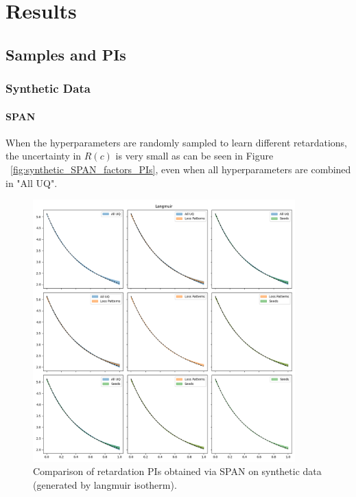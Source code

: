 \section{Results}
\subsection{Samples and PIs}
\subsubsection{Synthetic Data}

\paragraph{SPAN}
When the hyperparameters are randomly sampled to learn different retardations, the uncertainty in $R(c)$ is very small as can be seen in Figure ~\vref{fig:synthetic_SPAN_factors_PIs}, even when all hyperparameters are combined in "All UQ".

\begin{figure}
    \centering
    \includegraphics[width=0.9\textwidth]{figs/finn_synthetic_SPAN_factors_PIs.png}
    \caption{Comparison of retardation PIs obtained via SPAN on synthetic data (generated by langmuir isotherm).}
    \label{fig:synthetic_SPAN_factors_PIs}
\end{figure}

